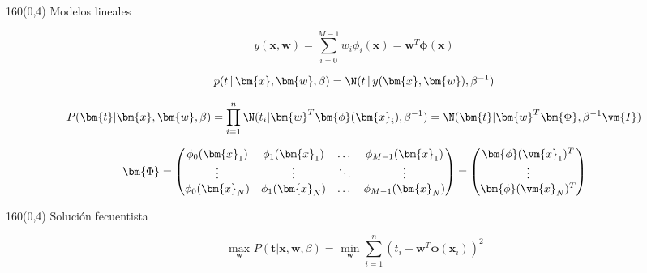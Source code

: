 \documentclass[shownotes,aspectratio=169]{beamer}
\begin{document}
\begin{frame}[plain]
\begin{textblock}{160}(0,4)
\centering \Large Modelos lineales
\end{textblock}
 \vspace{1.25cm}
 
\begin{equation*}
y(\bm{x},\bm{w}) = \sum_{i=0}^{M-1} w_i \phi_i(\bm{x}) = \bm{w}^T \bm{\phi}(\bm{x})
\end{equation*}

\vspace{0.5cm}
\pause
% 
 
 \begin{equation*}
p(t \, | \, \bm{x}, \bm{w}, \beta) = \N(t \, | \, y(\bm{x},\bm{w}) , \beta^{-1})
\end{equation*}
\vspace{0.025cm}
\pause
 
\begin{equation*}
P(\bm{t} | \bm{x}, \bm{w}, \beta) = \prod_{i=1}^n \N(t_i | \bm{w}^T \bm{\phi}(\bm{x}_i) , \beta^{-1}) = \N(\bm{t}|\bm{w}^T \bm{\Phi}, \beta^{-1} \vm{I})
\end{equation*}
\vspace{0.05cm}
\pause

\begin{equation*}
 \bm{\Phi} =
  \begin{pmatrix}
    \phi_0(\bm{x}_1) & \phi_1(\bm{x}_1) & \dots & \phi_{M-1}(\bm{x}_1)\\
    \vdots & \vdots & \ddots & \vdots \\
    \phi_0(\bm{x}_N) & \phi_1(\bm{x}_N) & \dots & \phi_{M-1}(\bm{x}_N)
  \end{pmatrix}
  = 
  \begin{pmatrix}
   \bm{\phi}(\vm{x}_1)^T \\
   \vdots \\
   \bm{\phi}(\vm{x}_N)^T \\
  \end{pmatrix}
\end{equation*}

 
\end{frame}



\begin{frame}[plain]
\begin{textblock}{160}(0,4)
 \centering \Large Solución fecuentista
\end{textblock}
\vspace{1.25cm}


\begin{equation*}
 \underset{\bm{w}}{\text{ max }} P(\bm{t} | \bm{x}, \bm{w}, \beta) = \underset{\bm{w}}{\text{ min }} \sum_{i=1}^{n}  (t_i - \bm{w}^T\bm{\phi}(\bm{x}_i))^2 
\end{equation*}

\end{frame}
\end{document}
